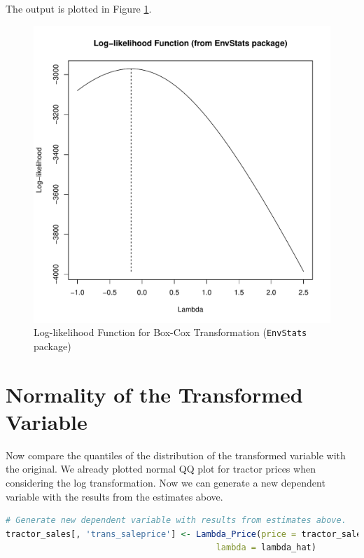 The output is plotted in Figure \ref{fig:plot_like_EnvStats}.

\begin{figure}[h!]
  \centering
  \includegraphics[scale = 0.5, keepaspectratio=true]{../Figures/plot_like_EnvStats}
  \caption{Log-likelihood Function for Box-Cox Transformation (\texttt{EnvStats} package)} \label{fig:plot_like_EnvStats}
\end{figure}






\clearpage
\section*{Normality of the Transformed Variable}

Now compare the quantiles of the distribution of the transformed variable with 
the original. 
We already plotted normal QQ plot for tractor prices when considering the log transformation.
Now we can generate a new dependent variable with the results from the estimates above.


\begin{lstlisting}[language=R]
# Generate new dependent variable with results from estimates above.
tractor_sales[, 'trans_saleprice'] <- Lambda_Price(price = tractor_sales[, 'saleprice'],
                                          lambda = lambda_hat)
\end{lstlisting}

